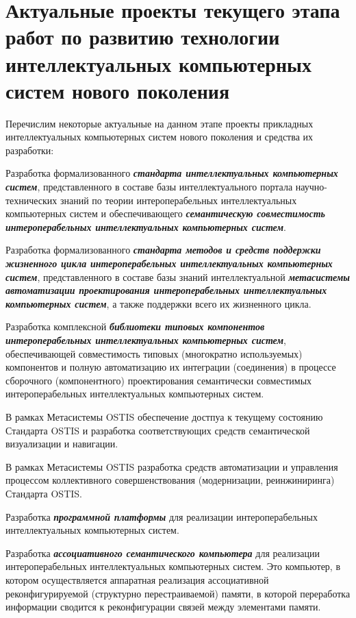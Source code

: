 \section*{Актуальные проекты текущего этапа работ по развитию технологии интеллектуальных компьютерных систем нового поколения}
\label{concl_actual_projects_current_stage_work_development_technology}

Перечислим некоторые актуальные на данном этапе проекты прикладных интеллектуальных компьютерных систем нового поколения и средства их разработки:
\begin{textitemize}
	\item 
	Разработка формализованного \textbf{\textit{стандарта интеллектуальных компьютерных систем}}, представленного в составе базы интеллектуального портала научно-технических знаний по теории интероперабельных интеллектуальных компьютерных систем и обеспечивающего \textbf{\textit{семантическую совместимость интероперабельных интеллектуальных компьютерных систем}}.
	\medskip
	\item 
	Разработка формализованного \textbf{\textit{стандарта методов и средств поддержки жизненного цикла интероперабельных интеллектуальных компьютерных систем}}, представленного в составе базы знаний интеллектуальной \textbf{\textit{метасистемы автоматизации проектирования интероперабельных интеллектуальных компьютерных систем}}, а также поддержки всего их жизненного цикла.
	\medskip
	\item 
	Разработка комплексной \textbf{\textit{библиотеки типовых компонентов интероперабельных интеллектуальных компьютерных систем}}, обеспечивающей совместимость типовых (многократно используемых) компонентов и полную автоматизацию их интеграции (соединения) в процессе сборочного (компонентного) проектирования семантически совместимых интероперабельных интеллектуальных компьютерных систем.
	\medskip
	\item 
	В рамках Метасистемы OSTIS обеспечение  достпуа к текущему состоянию Стандарта OSTIS и разработка соответствующих средств семантической визуализации и навигации.
	\medskip
	\item 
	В рамках Метасистемы OSTIS разработка средств автоматизации и управления процессом коллективного совершенствования (модернизации, реинжиниринга) Стандарта OSTIS.
	\medskip
	\item
	Разработка \textbf{\textit{программной платформы}} для реализации интероперабельных интеллектуальных компьютерных систем.
	\medskip
	\item 
	Разработка \textbf{\textit{ассоциативного семантического компьютера}} для реализации интероперабельных интеллектуальных компьютерных систем. Это  компьютер, в котором осуществляется аппаратная реализация ассоциативной реконфигурируемой (структурно перестраиваемой) памяти, в которой переработка информации сводится к реконфигурации связей между элементами памяти.

\end{textitemize}
